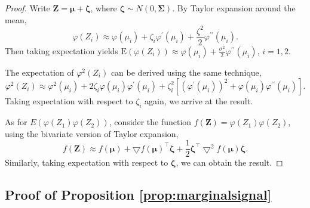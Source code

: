 \begin{proof}
Write $\mathbf{Z}=\boldsymbol{\mu}+\boldsymbol{\zeta}$, where $\boldsymbol{\zeta}\sim N(0,\boldsymbol{\Sigma})$.
By Taylor expansion around the mean, 
\begin{equation}
    \varphi(Z_i)\approx \varphi(\mu_i)+\zeta_i\varphi^{\prime}(\mu_i)+\frac{\zeta^2}{2}\varphi^{\prime\prime}(\mu_i).
\label{eq:taylorlogitnomralmean}
\end{equation}
Then taking expectation yields $\text{E}(\varphi(Z_i))\approx \varphi(\mu_i)+\frac{\sigma^2}{2}\varphi^{\prime\prime}(\mu_i)$, $i=1,2$.

The expectation of $\varphi^2(Z_i)$ can be derived using the same technique,
\begin{equation}
    \varphi^2(Z_i)\approx \varphi^2(\mu_i)+2\zeta_i\varphi(\mu_i)\varphi^{\prime}(\mu_i)+\zeta_i^2[(\varphi^{\prime}(\mu_i))^2+\varphi(\mu_i)\varphi^{\prime\prime}(\mu_i)].
    \label{eq:taylorlogitnormalvar}
\end{equation}
Taking expectation with respect to $\zeta_i$ again, we arrive at the result. 

As for $E(\varphi(Z_1)\varphi(Z_2))$, consider the function $f(\mathbf{Z})=\varphi(Z_1)\varphi(Z_2)$, using the bivariate version of Taylor expansion,
\begin{equation}
f(\mathbf{Z})\approx f(\boldsymbol{\mu})+\bigtriangledown f(\boldsymbol{\mu})^{\top}\boldsymbol{\zeta}+\frac{1}{2}\boldsymbol{\zeta}^{\top}\bigtriangledown^2f(\boldsymbol{\mu})\boldsymbol{\zeta}.
\label{eq:taylorlogitnormalcov}    
\end{equation}
Similarly, taking expectation with respect to $\boldsymbol{\zeta}$, we can obtain the result. 

\end{proof}



\subsection*{Proof of Proposition \ref{prop:marginalsignal}}
\label{subsec:proofmarginalsignal}

